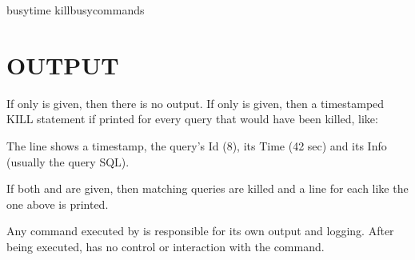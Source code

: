 \documentclass[letterpaper,10pt,english]{sphinxmanual}
\begin{document}
\begin{sphinxVerbatim}[commandchars=\\\{\}]
\PYGZhy{}\PYGZhy{}busy\PYGZhy{}time  \PYGZhy{}\PYGZhy{}kill\PYGZhy{}busy\PYGZhy{}commands 
\end{sphinxVerbatim}


\section{OUTPUT}
\label{\detokenize{mariadb-kill:output}}
\sphinxAtStartPar
If only {\hyperref[\detokenize{mariadb-kill:cmdoption-mariadb-kill-kill}]{}} is given, then there is no output.  If only
{\hyperref[\detokenize{mariadb-kill:cmdoption-mariadb-kill-print}]{}} is given, then a timestamped KILL statement if printed
for every query that would have been killed, like:

\begin{sphinxVerbatim}[commandchars=\\\{\}]
\end{sphinxVerbatim}

\sphinxAtStartPar
The line shows a timestamp, the query’s Id (8), its Time (42 sec) and its
Info (usually the query SQL).

\sphinxAtStartPar
If both {\hyperref[\detokenize{mariadb-kill:cmdoption-mariadb-kill-kill}]{}} and {\hyperref[\detokenize{mariadb-kill:cmdoption-mariadb-kill-print}]{}} are given, then matching queries are
killed and a line for each like the one above is printed.

\sphinxAtStartPar
Any command executed by {\hyperref[\detokenize{mariadb-kill:cmdoption-mariadb-kill-execute-command}]{}} is responsible for its own
output and logging.  After being executed,  has no control or interaction
with the command.
\end{document}
